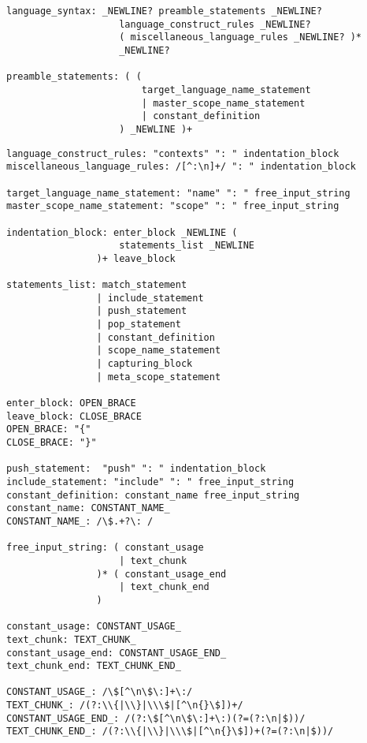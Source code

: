 \begin{lstlisting}[caption={Simbolo Inicial da Metalinguagem},label={simboloInicialDaMetalinguagem}]
language_syntax: _NEWLINE? preamble_statements _NEWLINE?
                    language_construct_rules _NEWLINE?
                    ( miscellaneous_language_rules _NEWLINE? )*
                    _NEWLINE?

preamble_statements: ( (
                        target_language_name_statement
                        | master_scope_name_statement
                        | constant_definition
                    ) _NEWLINE )+
\end{lstlisting}

\begin{lstlisting}
language_construct_rules: "contexts" ": " indentation_block
miscellaneous_language_rules: /[^:\n]+/ ": " indentation_block

target_language_name_statement: "name" ": " free_input_string
master_scope_name_statement: "scope" ": " free_input_string

indentation_block: enter_block _NEWLINE (
                    statements_list _NEWLINE
                )+ leave_block

statements_list: match_statement
                | include_statement
                | push_statement
                | pop_statement
                | constant_definition
                | scope_name_statement
                | capturing_block
                | meta_scope_statement

enter_block: OPEN_BRACE
leave_block: CLOSE_BRACE
OPEN_BRACE: "{"
CLOSE_BRACE: "}"

push_statement:  "push" ": " indentation_block
include_statement: "include" ": " free_input_string
constant_definition: constant_name free_input_string
constant_name: CONSTANT_NAME_
CONSTANT_NAME_: /\$.+?\: /

free_input_string: ( constant_usage
                    | text_chunk
                )* ( constant_usage_end
                    | text_chunk_end
                )

constant_usage: CONSTANT_USAGE_
text_chunk: TEXT_CHUNK_
constant_usage_end: CONSTANT_USAGE_END_
text_chunk_end: TEXT_CHUNK_END_

CONSTANT_USAGE_: /\$[^\n\$\:]+\:/
TEXT_CHUNK_: /(?:\\{|\\}|\\\$|[^\n{}\$])+/
CONSTANT_USAGE_END_: /(?:\$[^\n\$\:]+\:)(?=(?:\n|$))/
TEXT_CHUNK_END_: /(?:\\{|\\}|\\\$|[^\n{}\$])+(?=(?:\n|$))/


\end{lstlisting}
